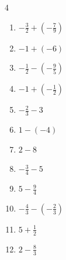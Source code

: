 \begin{multicols}{4}
\begin{enumerate}

  \item $\displaystyle -\frac{3}{2} + \left(-\frac{7}{9}\right)$


  \item $\displaystyle -1 + \left(-6\right)$

        \phantom{$\displaystyle =-7$}

  \item $\displaystyle -\frac{1}{2} - \left(-\frac{9}{5}\right)$


  \item $\displaystyle -1 + \left(-\frac{1}{2}\right)$


  \item $\displaystyle -\frac{2}{3} - 3$


  \item $\displaystyle 1 - \left(-4\right)$

        \phantom{$\displaystyle =5$}

  \item $\displaystyle 2 - 8$

        \phantom{$\displaystyle =-6$}

  \item $\displaystyle -\frac{3}{4} - 5$


  \item $\displaystyle 5 - \frac{9}{4}$


\columnbreak %

  \item $\displaystyle -\frac{4}{3} - \left(-\frac{2}{3}\right)$


  \item $\displaystyle 5 + \frac{1}{2}$


  \item $\displaystyle 2 - \frac{8}{3}$


\end{enumerate}
\end{multicols}
